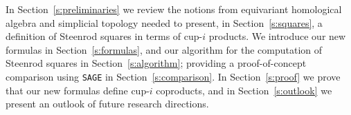In Section~\ref{s:preliminaries} we review the notions from equivariant homological algebra and simplicial topology needed to present, in Section~\ref{s:squares}, a definition of Steenrod squares in terms of cup-$i$ products.
We introduce our new formulas in Section~\ref{s:formulas}, and our algorithm for the computation of Steenrod squares in Section~\ref{s:algorithm}; providing a proof-of-concept comparison using \verb|SAGE| in Section~\ref{s:comparison}.
In Section~\ref{s:proof} we prove that our new formulas define cup-$i$ coproducts, and in Section~\ref{s:outlook} we present an outlook of future research directions.